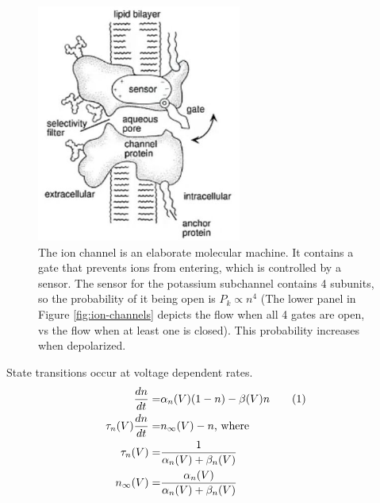 \documentclass[]{article}
\newcommand\numberthis{\addtocounter{equation}{1}\tag{\theequation}}
\begin{document}
\begin{figure}[H]
	\begin{center}
		\caption[The ion channel is an elaborate molecular machine]{The ion channel is an elaborate molecular machine. It contains a gate that prevents ions from entering, which is controlled by a sensor. The sensor for the potassium subchannel contains 4 subunits, so the probability of it being open is $P_k \propto n^4$ (The lower panel in Figure \ref{fig:ion-channels} depicts the flow when all 4 gates are open, vs the flow when at least one is closed). This probability increases when depolarized.}
	\includegraphics[width=0.6\textwidth]{ion-channel-as-molecular-machine}
	\end{center}
\end{figure}
State transitions occur at voltage dependent rates.
\begin{align*}
	\frac{dn}{dt} =& \alpha_n(V)(1-n) - \beta(V)n \numberthis \label{eq:n}\\
	\tau_n(V) \frac{dn}{dt} =&n_\infty(V)-n\text{, where}\\
	\tau_n(V) =& \frac{1}{\alpha_n(V) + \beta_n(V)}\\
	n_\infty(V) =&  \frac{\alpha_n(V)}{\alpha_n(V) + \beta_n(V)}
\end{align*}
\end{document}
